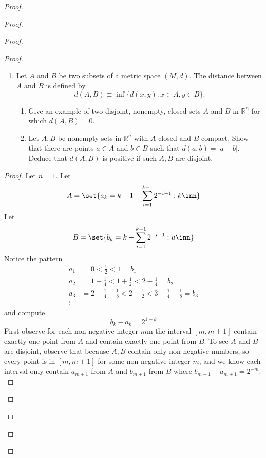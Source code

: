 \documentclass{report}
\begin{document}
\begin{proof}
\begin{proof}
\begin{proof}
\begin{proof}
\begin{question}{}{}
\begin{enumerate}
    \item Let \( A \) and \( B \) be two subsets of a metric space \( (M,d) \). The distance between \( A \) and \( B \) is defined by
    \[
    d(A,B) \equiv \inf\{d(x,y) : x \in A, y \in B\}.
    \]
    \begin{enumerate}
        \item Give an example of two disjoint, nonempty, closed sets \( A \) and \( B \) in \( \mathbb{R}^n \) for which \( d(A, B) = 0 \).
        \item Let \( A, B \) be nonempty sets in \( \mathbb{R}^n \) with \( A \) closed and \( B \) compact. Show that there are points \( a \in A \) and \( b \in B \) such that \( d(a, b) = |a-b| \). Deduce that \( d(A, B) \) is positive if such \( A, B \) are disjoint.
    \end{enumerate}
\end{enumerate}
\end{question}
\begin{proof}
Let $n=1$. Let 
\begin{equation*}
A=\set{a_k=k-1+\sum_{i=1}^{k-1}2^{-i-1}:k\inn}
\end{equation*}
Let
\begin{equation*}
B=\set{b_k=k-\sum_{i=1}^{k-1}2^{-i-1}:u\inn}
\end{equation*}
Notice the pattern
\begin{align*}
  a_1&=0<\frac{1}{2}< 1=b_1\\
  a_2&=1+\frac{1}{4}< 1+\frac{1}{2}< 2-\frac{1}{4}=b_2\\
  a_3&=2+\frac{1}{4}+\frac{1}{8}< 2+\frac{1}{2}< 3-\frac{1}{4}-\frac{1}{8}=b_3\\
  \vdots
\end{align*}
and compute
\begin{equation*}
b_k-a_k=2^{1-k}
\end{equation*}
First observe for each non-negative integer $m$m the interval  $[m,m+1]$ contain exactly one point from $A$ and contain exactly one point from  $B$. To see  $A$ and  $B$ are disjoint, observe that because  $A,B$ contain only non-negative numbers, so every point is in $[m,m+1]$ for some non-negative integer $m$, and we know each interval only contain $a_{m+1}$ from $A$ and $b_{m+1}$ from $B$ where  $b_{m+1}-a_{m+1}=2^{-m}$.\\


\end{proof}
\end{proof}
\end{proof}
\end{proof}
\end{proof}
\end{document}
